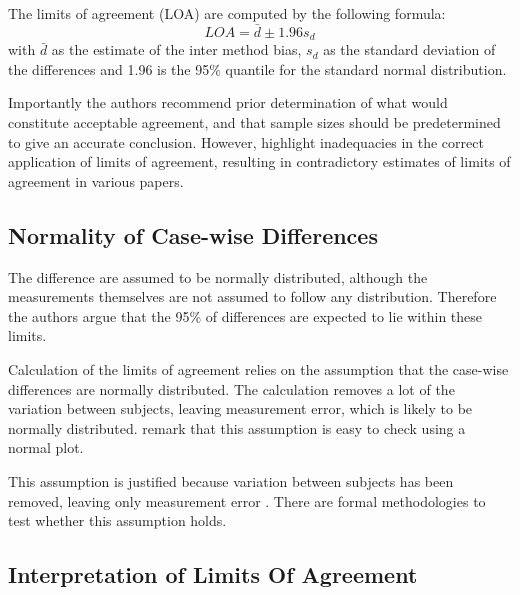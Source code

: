 \documentclass[12pt, a4paper]{report}
\theoremstyle{plain}
\theoremstyle{definition}
\theoremstyle{remark}
\begin{document}
	The limits of agreement (LOA) are computed by the following
	formula:
	\[
	LOA = \bar{d} \pm 1.96 s_{d}
	\]
	with $\bar{d}$ as the estimate of the inter method bias, $s_{d}$
	as the standard deviation of the differences and 1.96 is the 95\%
	quantile for the standard normal distribution. 
	
	Importantly the authors recommend prior determination of what would constitute acceptable agreement, and that sample sizes should be predetermined to give an accurate conclusion. However, \citet{mantha} highlight inadequacies in the correct application of limits of agreement, resulting in contradictory estimates of limits of agreement in various papers.
	
	
	
	
	
	
	
	
	\subsection{Normality of Case-wise Differences}	
	The difference are assumed to be normally distributed, although the measurements themselves are not assumed to follow any distribution. Therefore the authors argue that the 95\% of differences are expected to lie within these limits. 
	
	Calculation of the limits of agreement relies on the assumption that the case-wise differences are normally distributed.
	The calculation removes a lot of the variation between subjects,  leaving measurement error, which is likely to be normally distributed. \citet{BA99} remark that this assumption is easy to check using a normal plot. 
	
	
	This assumption is justified because variation between subjects has been removed, leaving only measurement error \citep{BA86}. There are formal methodologies to test whether this assumption holds.
	
	
	
	
	
	
	\subsection{Interpretation of Limits Of Agreement}
	
\end{document}
